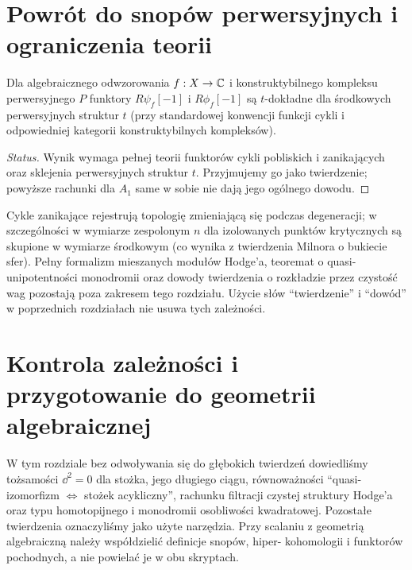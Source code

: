 \section{Powrót do snopów perwersyjnych i ograniczenia teorii}
\begin{twierdzenie}
Dla algebraicznego odwzorowania $f:X\to\mathbb{C}$ i
konstruktybilnego kompleksu perwersyjnego $P$
funktory $R\psi_f[-1]$ i $R\phi_f[-1]$
są $t$-dokładne dla środkowych perwersyjnych
struktur $t$ (przy standardowej konwencji
funkcji cykli i odpowiedniej kategorii
konstruktybilnych kompleksów).
\end{twierdzenie}
\begin{proof}[Status]
Wynik wymaga pełnej teorii funktorów cykli
pobliskich i zanikających oraz sklejenia
perwersyjnych struktur $t$. Przyjmujemy go
jako twierdzenie; powyższe rachunki dla
$A_1$ same w sobie nie dają jego ogólnego dowodu.
\end{proof}
\begin{uwaga}
Cykle zanikające rejestrują topologię zmieniającą
się podczas degeneracji; w szczególności w
wymiarze zespolonym $n$ dla izolowanych punktów
krytycznych są skupione w wymiarze środkowym
(co wynika z twierdzenia Milnora o bukiecie sfer).
Pełny formalizm mieszanych modułów Hodge'a,
teoremat o quasi-unipotentności monodromii
oraz dowody twierdzenia o rozkładzie przez
czystość wag pozostają poza zakresem tego rozdziału.
Użycie słów ``twierdzenie'' i ``dowód'' w
poprzednich rozdziałach nie usuwa tych zależności.
\end{uwaga}

\section{Kontrola zależności i przygotowanie do geometrii algebraicznej}
W tym rozdziale bez odwoływania się do głębokich twierdzeń
dowiedliśmy tożsamości
$\dd^2=0$ dla stożka, jego długiego ciągu,
równoważności ``quasi-izomorfizm $\Leftrightarrow$
stożek acykliczny'', rachunku filtracji
czystej struktury Hodge'a oraz typu homotopijnego
i monodromii osobliwości kwadratowej. Pozostałe
twierdzenia oznaczyliśmy jako użyte narzędzia.
Przy scalaniu z geometrią algebraiczną
należy współdzielić definicje snopów, hiper-
kohomologii i funktorów pochodnych, a nie
powielać je w obu skryptach.

